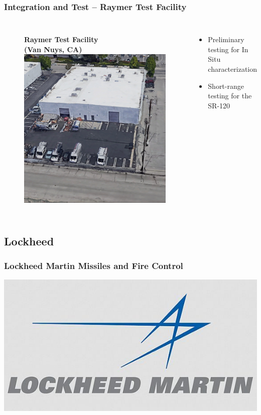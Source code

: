 \documentclass[aspectratio=169]{beamer}
\begin{document}
\begin{frame}
  \frametitle{Integration and Test -- Raymer Test Facility}
  \begin{columns}[c]
    \begin{figure}
      \textbf{Raymer Test Facility\\
        (Van Nuys, CA)}
      \includegraphics[width=\linewidth]{Raymer.jpg}
    \end{figure}

    \begin{itemize}
    \item Preliminary testing for In Situ characterization
    \item Short-range testing for the SR-120
    \end{itemize}
  \end{columns}
\end{frame}

\subsection{Lockheed}
\begin{frame}
  \frametitle{Lockheed Martin Missiles and Fire Control}
  \center
  \includegraphics[width=.7\linewidth]{LockheedLogo}
\end{frame}
\end{document}
